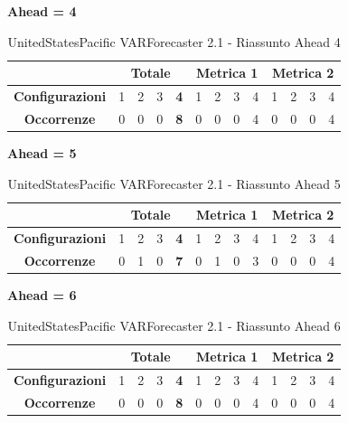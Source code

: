 \documentclass[12pt,a4paper,oneside,openright]{book}
\begin{document}
\medskip
\textbf{Ahead = 4}


\begin{table}[H]
\centering
\begin{tabular}{|c|c|c|c|c|c|c|c|c|c|c|c|c|}
\hline
 & \multicolumn{4}{|c|}{\textbf{Totale}} & \multicolumn{4}{|c|}{\textbf{Metrica 1}} & \multicolumn{4}{|c|}{\textbf{Metrica 2}} \\
\hline
\textbf{Configurazioni} & 1 & 2 & 3 & \textbf{4} & 1 & 2 & 3 & 4 & 1 & 2 & 3 & 4 \\
\hline
\textbf{Occorrenze} & 0 & 0 & 0 & \textbf{8} & 0 & 0 & 0 & 4 & 0 & 0 & 0 & 4\\
\hline
\end{tabular}
\caption{UnitedStatesPacific VARForecaster 2.1 - Riassunto Ahead 4}
\end{table}

\medskip
\textbf{Ahead = 5}


\begin{table}[H]
\centering
\begin{tabular}{|c|c|c|c|c|c|c|c|c|c|c|c|c|}
\hline
 & \multicolumn{4}{|c|}{\textbf{Totale}} & \multicolumn{4}{|c|}{\textbf{Metrica 1}} & \multicolumn{4}{|c|}{\textbf{Metrica 2}} \\
\hline
\textbf{Configurazioni} & 1 & 2 & 3 & \textbf{4} & 1 & 2 & 3 & 4 & 1 & 2 & 3 & 4 \\
\hline
\textbf{Occorrenze} & 0 & 1 & 0 & \textbf{7} & 0 & 1 & 0 & 3 & 0 & 0 & 0 & 4\\
\hline
\end{tabular}
\caption{UnitedStatesPacific VARForecaster 2.1 - Riassunto Ahead 5}
\end{table}

\medskip
\textbf{Ahead = 6}


\begin{table}[H]
\centering
\begin{tabular}{|c|c|c|c|c|c|c|c|c|c|c|c|c|}
\hline
 & \multicolumn{4}{|c|}{\textbf{Totale}} & \multicolumn{4}{|c|}{\textbf{Metrica 1}} & \multicolumn{4}{|c|}{\textbf{Metrica 2}} \\
\hline
\textbf{Configurazioni} & 1 & 2 & 3 & \textbf{4} & 1 & 2 & 3 & 4 & 1 & 2 & 3 & 4 \\
\hline
\textbf{Occorrenze} & 0 & 0 & 0 & \textbf{8} & 0 & 0 & 0 & 4 & 0 & 0 & 0 & 4\\
\hline
\end{tabular}
\caption{UnitedStatesPacific VARForecaster 2.1 - Riassunto Ahead 6}
\end{table} 
\end{document}
